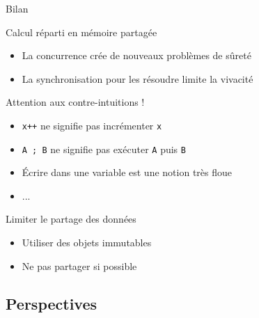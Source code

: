\begin{frame}[fragile]{Bilan}

  \vfill
  \begin{block}{Calcul réparti en mémoire partagée}
    \begin{itemize}
    \item La concurrence crée de nouveaux problèmes de sûreté
    \item La synchronisation pour les résoudre limite la vivacité
    \end{itemize}
  \end{block}
  \vfill
  \begin{block}{Attention aux contre-intuitions !}
    \begin{itemize}
    \item \lstinline{x++} \alert{ne signifie pas} \og incrémenter \lstinline{x} \fg
    \item \lstinline{A ; B} \alert{ne signifie pas} \og exécuter \lstinline{A} puis \lstinline{B} \fg
    \item \og Écrire dans une variable \fg{} est une notion très floue
    \item ...
    \end{itemize}
  \end{block}
  \vfill
  \begin{alertblock}{Limiter le partage des données}
    \begin{itemize}
    \item Utiliser des objets immutables
    \item Ne pas partager si possible
    \end{itemize}
  \end{alertblock}
  \vfill
\end{frame}


\subsection{Perspectives}

